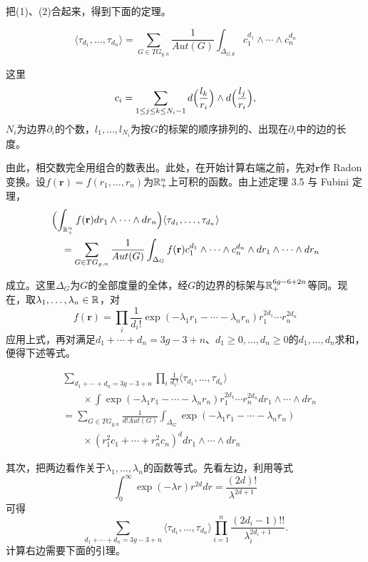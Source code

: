 把(1)、(2)合起来，得到下面的定理。


\begin{theorem}
\[
\langle\tau_{d_1},\dots,\tau_{d_n}\rangle
=\sum_{G\in TG_{g,n}}\frac{1}{Aut(G)}\int_{\Delta_{G,\mathbf{r}}}c_1^{d_1}\wedge\cdots\wedge c_n^{d_n}
\]
\end{theorem}

这里
\[
c_i=\sum_{1\le j\le k\le N_i-1}d\Bigl(\frac{l_k}{r_i}\Bigr)\wedge d\Bigl(\frac{l_j}{r_i}\Bigr),
\]
$N_i$为边界$\partial_i$的个数，$l_1,\dots,l_{N_i}$为按$G$的标架的顺序排列的、出现在$\partial_i$中的边的长度。

由此，相交数完全用组合的数表出。此处，在开始计算右端之前，先对$\mathbf{r}$作 Radon 变换。设$f(\mathbf{r})=f(r_1,\dots,r_n)$为$\mathbb{R}_+^n$上可积的函数。由上述定理 3.5 与 Fubini 定理，
\[
\begin{aligned}
&\Bigl(\int_{\mathbb{R}_+^n}f(\mathbf{r})dr_1\wedge\cdots\wedge dr_n\Bigr)
\langle\tau_{d_1},\dots,\tau_{d_n}\rangle\\
&\quad=\sum_{G\in TG_{g,n}}\frac{1}{Aut(G)}
\int_{\Delta_G}f(\mathbf{r})c_1^{d_1}\wedge\cdots\wedge c_n^{d_n}\wedge dr_1\wedge\cdots\wedge dr_n
\end{aligned}
\]

成立。这里$\Delta_G$为$G$的全部度量的全体，经$G$的边界的标架与$\mathbb{R}_+^{6g-6+2n}$等同。现在，取$\lambda_1,\dots,\lambda_n\in\mathbb{R}$，对
\[
f(\mathbf{r})=\prod_i\frac{1}{d_i!}\exp(-\lambda_1r_1-\cdots-\lambda_nr_n)r_1^{2d_1}\cdots r_n^{2d_n}
\]
应用上式，再对满足$d_1+\cdots+d_n=3g-3+n$、$d_1\ge0,\dots,d_n\ge0$的$d_1,\dots,d_n$求和，便得下述等式。

\begin{proposition}
\[
\begin{aligned}
&\sum_{d_1+\cdots+d_n=3g-3+n}\prod_i\frac{1}{d_i!}\langle\tau_{d_1},\dots,\tau_{d_n}\rangle\\
&\qquad\times\int\exp(-\lambda_1r_1-\cdots-\lambda_nr_n)r_1^{2d_1}\cdots r_n^{2d_n}dr_1\wedge\cdots\wedge dr_n\\
&=\sum_{G\in TG_{g,n}}\frac{1}{d!Aut(G)}\int_{\Delta_G}\exp(-\lambda_1r_1-\cdots-\lambda_nr_n)\\
&\qquad\times(r_1^2c_1+\cdots+r_n^2c_n)^d dr_1\wedge\cdots\wedge dr_n
\end{aligned}
\]
\end{proposition}

其次，把两边看作关于$\lambda_1,\dots,\lambda_n$的函数等式。先看左边，利用等式
\[
\int_0^\infty\exp(-\lambda r)r^{2d}dr=\frac{(2d)!}{\lambda^{2d+1}}
\]
可得
\[
\sum_{d_1+\cdots+d_n=3g-3+n}\langle\tau_{d_1},\dots,\tau_{d_n}\rangle
\prod_{i=1}^n\frac{(2d_i-1)!!}{\lambda_i^{2d_i+1}}.
\]
计算右边需要下面的引理。

